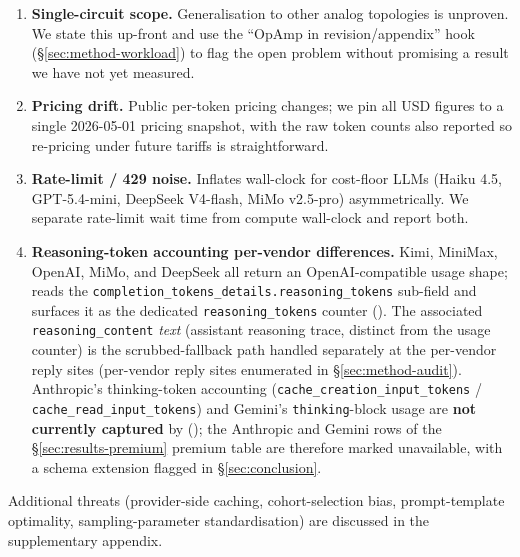 \begin{enumerate}
  \item \textbf{Single-circuit scope.} Generalisation to other
    analog topologies is unproven. We state this up-front and use
    the ``OpAmp in revision/appendix'' hook
    (\S\ref{sec:method-workload}) to flag the open problem without
    promising a result we have not yet measured.

  \item \textbf{Pricing drift.} Public per-token pricing changes;
    we pin all USD figures to a single 2026-05-01 pricing snapshot,
    with the raw token counts also reported so re-pricing under
    future tariffs is straightforward.

  \item \textbf{Rate-limit / 429 noise.} Inflates wall-clock for
    cost-floor LLMs (Haiku 4.5, GPT-5.4-mini, DeepSeek V4-flash,
    MiMo v2.5-pro) asymmetrically. We separate rate-limit wait time
    from compute wall-clock and report both.

  \item \textbf{Reasoning-token accounting per-vendor differences.}
    Kimi, MiniMax, OpenAI, MiMo, and DeepSeek all return an
    OpenAI-compatible usage shape;
     reads the
    \texttt{completion\_tokens\_details.reasoning\_tokens}
    sub-field and surfaces it as the dedicated
    \texttt{reasoning\_tokens} counter
    (). The associated
    \texttt{reasoning\_content} \emph{text} (assistant reasoning
    trace, distinct from the usage counter) is the
    scrubbed-fallback path handled separately at the per-vendor
    reply sites (per-vendor reply sites enumerated in
    \S\ref{sec:method-audit}). Anthropic's thinking-token accounting
    (\texttt{cache\_creation\_input\_tokens} /
    \texttt{cache\_read\_input\_tokens}) and Gemini's
    \texttt{thinking}-block usage are \textbf{not currently
    captured} by 
    (); the Anthropic and
    Gemini rows of the \S\ref{sec:results-premium} premium table
    are therefore marked unavailable, with a schema extension
    flagged in \S\ref{sec:conclusion}.

\end{enumerate}

\noindent Additional threats (provider-side caching,
cohort-selection bias, prompt-template optimality,
sampling-parameter standardisation) are discussed in the
supplementary appendix.
